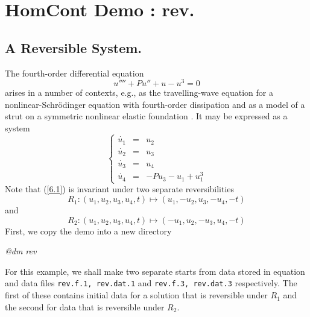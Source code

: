 \documentclass[12pt]{report}
\begin{document}
\chapter{ {\cal HomCont} Demo : rev.} \label{ch:HomCont_rev}

\section{ A Reversible System.}
The fourth-order differential equation
$$
u'''' + P u'' + u -u^3 =0
$$
arises in a number of contexts, e.g., as the travelling-wave
equation for a nonlinear-Schr\"{o}dinger equation with fourth-order
dissipation \cite{BuAk:95} and as a model of a strut on a symmetric 
nonlinear elastic foundation \cite{HuBoTh:89}. It may be expressed as
a system
\begin{equation}
\left \{ 
\begin{array}{rcl}
\dot{u_1} & = & u_2 \\
\dot{u_2} & = & u_3 \\
\dot{u_3} & = & u_4 \\
\dot{u_4} & = & -P u_3 - u_1 + u_1^3
\end{array}
\right.  
\label{6.1}
\end{equation}
Note that (\ref{6.1}) is invariant under two separate reversibilities
\begin{equation}
R_1: (u_1,u_2,u_3,u_4,t) \mapsto (u_1,-u_2,u_3,-u_4,-t)  
\label{6.R1}
\end{equation}
and 
\begin{equation}
R_2: (u_1,u_2,u_3,u_4,t) \mapsto (-u_1,u_2,-u_3,u_4,-t)  
\label{6.R2}
\end{equation}
First, we copy the demo into a new directory 
\begin{center}
{\it @dm rev }
\end{center}
For this example, we shall make two separate starts
from data stored in equation and data files {\tt rev.f.1,
rev.dat.1} and {\tt rev.f.3, rev.dat.3} respectively. The first
of these contains initial data for a solution that is reversible
under $R_1$ and the second for data that is reversible under $R_2$. 
%
\end{document}
